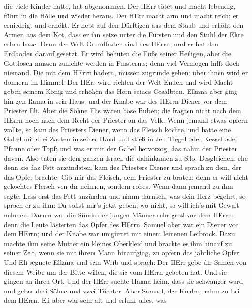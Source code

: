 die viele Kinder hatte, hat abgenommen.  Der HErr tötet und
macht lebendig, führt in die Hölle und wieder heraus.  Der
HErr macht arm und macht reich; er erniedrigt und erhöht. 
Er hebt auf den Dürftigen aus dem Staub und erhöht den Armen aus dem
Kot, dass er ihn setze unter die Fürsten und den Stuhl der Ehre erben
lasse. Denn der Welt Grundfesten sind des HErrn, und er hat den Erdboden
darauf gesetzt.  Er wird behüten die Füße seiner Heiligen,
aber die Gottlosen müssen zunichte werden in Finsternis; denn viel
Vermögen hilft doch niemand.  Die mit dem HErrn hadern,
müssen zugrunde gehen; über ihnen wird er donnern im Himmel. Der HErr
wird richten der Welt Enden und wird Macht geben seinem König und
erhöhen das Horn seines Gesalbten.  Elkana aber ging hin
gen Rama in sein Haus; und der Knabe war des HErrn Diener vor dem
Priester Eli.  Aber die Söhne Elis waren böse Buben; die
fragten nicht nach dem HErrn  noch nach dem Recht der
Priester an das Volk. Wenn jemand etwas opfern wollte, so kam des
Priesters Diener, wenn das Fleisch kochte, und hatte eine Gabel mit drei
Zacken in seiner Hand  und stieß in den Tiegel oder Kessel
oder Pfanne oder Topf; und was er mit der Gabel hervorzog, das nahm der
Priester davon. Also taten sie dem ganzen Israel, die dahinkamen zu
Silo.  Desgleichen, ehe denn sie das Fett anzündeten, kam
des Priesters Diener und sprach zu dem, der das Opfer brachte: Gib mir
das Fleisch, dem Priester zu braten; denn er will nicht gekochtes
Fleisch von dir nehmen, sondern rohes.  Wenn dann jemand zu
ihm sagte: Lass erst das Fett anzünden und nimm darnach, was dein Herz
begehrt, so sprach er zu ihm: Du sollst mir's jetzt geben; wo nicht, so
will ich's mit Gewalt nehmen.  Darum war die Sünde der
jungen Männer sehr groß vor dem HErrn; denn die Leute lästerten das
Opfer des HErrn.  Samuel aber war ein Diener vor dem HErrn;
und der Knabe war umgürtet mit einem leinenen Leibrock. 
Dazu machte ihm seine Mutter ein kleines Oberkleid und brachte es ihm
hinauf zu seiner Zeit, wenn sie mit ihrem Mann hinaufging, zu opfern das
jährliche Opfer.  Und Eli segnete Elkana und sein Weib und
sprach: Der HErr gebe dir Samen von diesem Weibe um der Bitte willen,
die sie vom HErrn gebeten hat. Und sie gingen an ihren Ort.
 Und der HErr suchte Hanna heim, dass sie schwanger ward
und gebar drei Söhne und zwei Töchter. Aber Samuel, der Knabe, nahm zu
bei dem HErrn.  Eli aber war sehr alt und erfuhr alles, was
